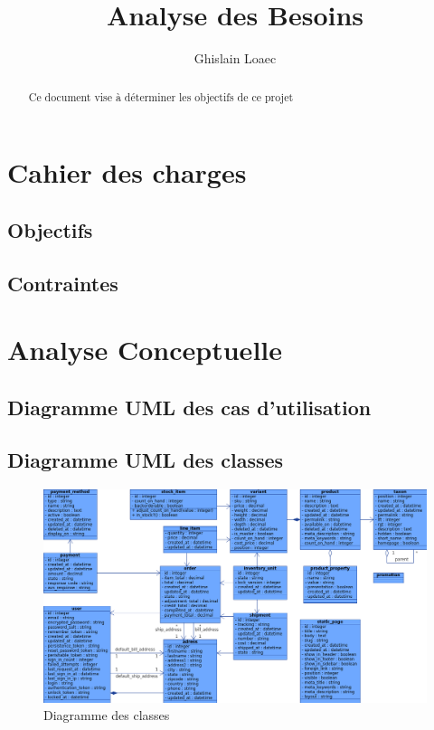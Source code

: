 \documentclass{article}
\begin{document}
\title{Analyse des Besoins}
\author{Ghislain Loaec}
\maketitle

\begin{abstract}
Ce document vise à déterminer les objectifs de ce projet
\end{abstract}

\tableofcontents
\listoffigures
\listoftables

\section{Cahier des charges}

\subsection{Objectifs}
\subsection{Contraintes}

\section{Analyse Conceptuelle}

\subsection{Diagramme UML des cas d'utilisation}



\subsection{Diagramme UML des classes}

\begin{figure}[H]
\includegraphics[width=\textwidth]{class_diagram.png} 
\caption{Diagramme des classes}
\label{class_diagram}
\end{figure}
\end{document}
